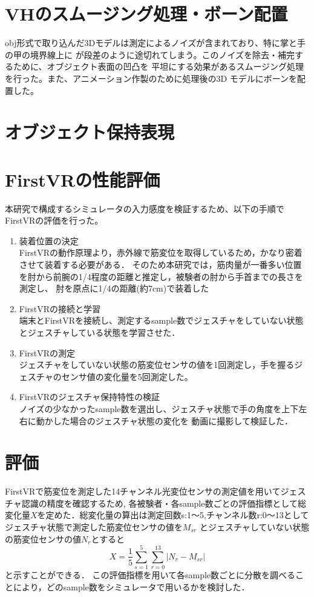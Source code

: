 \documentclass{ltjsreport}
\begin{document}
	\section{VHのスムージング処理・ボーン配置}
		obj形式で取り込んだ3Dモデルは測定によるノイズが含まれており、特に掌と手の甲の境界線上に
		が段差のように途切れてしまう。このノイズを除去・補完するために、オブジェクト表面の凹凸を
		平坦にする効果があるスムージング処理を行った。また、アニメーション作製のために処理後の3D
		モデルにボーンを配置した。

	
	\section{オブジェクト保持表現}

	\section{FirstVRの性能評価}
		本研究で構成するシミュレータの入力感度を検証するため、以下の手順でFirstVRの評価を行った。
			\begin{enumerate}
				\item 装着位置の決定\\
					FirstVRの動作原理より，赤外線で筋変位を取得しているため，かなり密着させて装着する必要がある．
					そのため本研究では，筋肉量が一番多い位置を肘から前腕の1/4程度の距離と推定し，被験者の肘から手首までの長さを測定し、
					肘を原点に1/4の距離(約7cm)で装着した
				\item FirstVRの接続と学習\\
					端末とFirstVRを接続し、測定するsample数でジェスチャをしていない状態とジェスチャしている状態を学習させた．
				\item FirstVRの測定\\
					ジェスチャをしていない状態の筋変位センサの値を1回測定し，手を握るジェスチャのセンサ値の変化量を5回測定した。
				\item FirstVRのジェスチャ保持特性の検証\\
					ノイズの少なかったsample数を選出し、ジェスチャ状態で手の角度を上下左右に動かした場合のジェスチャ状態の変化を
					動画に撮影して検証した．
			\end{enumerate}

	\section{評価}
		FirstVRで筋変位を測定した14チャンネル光変位センサの測定値を用いてジェスチャ認識の精度を確認するため,
		各被験者・各sample数ごとの評価指標として総変化量$X$を定めた．総変化量の算出は測定回数s:1～5,チャンネル数r:0～13としてジェスチャ状態で測定した筋変位センサの値を$M_{{s}{r}}$
		とジェスチャしていない状態の筋変位センサの値$N_{r}$とすると
		\begin{equation}
			X = \frac{1}{5} \sum_{s = 1}^{5} \sum_{r = 0}^{13} |N_{r} - M_{{s}{r}}|
		\end{equation}
		と示すことができる．
		この評価指標を用いて各sample数ごとに分散を調べることにより，どのsample数をシミュレータで用いるかを検討した．
		
\end{document}
